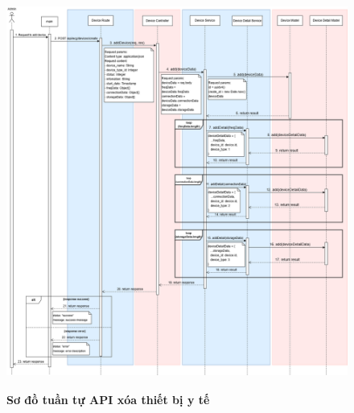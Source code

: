 \begin{figure}[H]
	\centering
	\includegraphics[width=15cm,height=13cm]{Images/api_sequence/device/device-Add.drawio.png}
	\caption[Sơ đồ tuần tự API xóa thiết bị y tế]{\bfseries \fontsize{12pt}{0pt}\selectfont Sơ đồ tuần tự API xóa thiết bị y tế}
	\label{sequence_diagram_get_device_by_id}
\end{figure}

